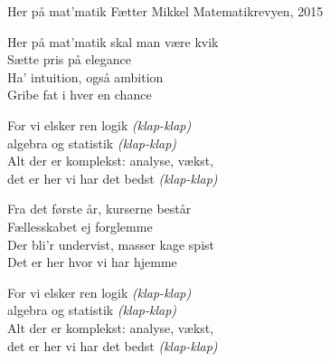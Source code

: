 \begin{song}{Her på mat'matik}
  {} %
  {Fætter Mikkel} %
  {} %
  {Matematikrevyen, 2015} %
  {\NotCCLIed} %

  \begin{SBVerse}
    Her på mat'matik skal man være kvik\\
    Sætte pris på elegance\\
    Ha' intuition, også ambition\\
    Gribe fat i hver en chance
  \end{SBVerse}

  \begin{SBChorus}
    For vi elsker ren logik \emph{(klap-klap)}\\
    algebra og statistik \emph{(klap-klap)}\\
    Alt der er komplekst: analyse, vækst,\\
    det er her vi har det bedst \emph{(klap-klap)}
  \end{SBChorus}

  \begin{SBVerse}
    Fra det første år, kurserne består\\
    Fællesskabet ej forglemme\\
    Der bli'r undervist, masser kage spist\\
    Det er her hvor vi har hjemme
  \end{SBVerse}

  \begin{SBChorus}
    For vi elsker ren logik \emph{(klap-klap)}\\
    algebra og statistik \emph{(klap-klap)}\\
    Alt der er komplekst: analyse, vækst,\\
    det er her vi har det bedst \emph{(klap-klap)}
  \end{SBChorus}

\end{song}